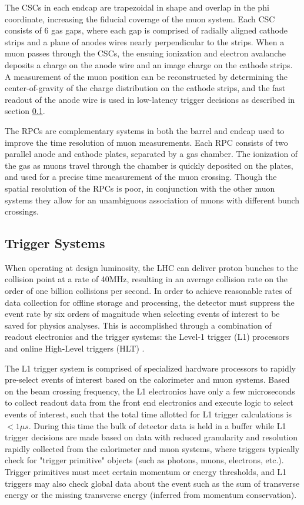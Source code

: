 The CSCs in each endcap are trapezoidal in shape and overlap in the phi coordinate, increasing the fiducial coverage of the muon system. Each CSC consists of 6 gas gaps, where each gap is comprised of radially aligned cathode strips and a plane of anodes wires nearly perpendicular to the strips. When a muon passes through the CSCs, the ensuing ionization and electron avalanche deposits a charge on the anode wire and an image charge on the cathode strips. A measurement of the muon position can be reconstructed by determining the center-of-gravity of the charge distribution on the cathode strips, and the fast readout of the anode wire is used in low-latency trigger decisions as described in section \ref{subsec:triggers}.

The RPCs are complementary systems in both the barrel and endcap used to improve the time resolution of muon measurements. Each RPC consists of two parallel anode and cathode plates, separated by a gas chamber. The ionization of the gas as muons travel through the chamber is quickly deposited on the plates, and used for a precise time measurement of the muon crossing. Though the spatial resolution of the RPCs is poor, in conjunction with the other muon systems they allow for an unambiguous association of muons with different bunch crossings.
 
\subsection{Trigger Systems}
\label{subsec:triggers}
When operating at design luminosity, the LHC can deliver proton bunches to the collision point at a rate of 40MHz, resulting in an average collision rate on the order of one billion collisions per second. In order to achieve reasonable rates of data collection for offline storage and processing, the detector must suppress the event rate by six orders of magnitude when selecting events of interest to be saved for physics analyses. This is accomplished through a combination of readout electronics and the trigger systems: the Level-1 trigger (L1) processors and online High-Level triggers (HLT) \cite{Lester:1999tx}.

The L1 trigger system is comprised of specialized hardware processors to rapidly pre-select events of interest based on the calorimeter and muon systems. Based on the beam crossing frequency, the L1 electronics have only a few microseconds to collect readout data from the front end electronics and execute logic to select events of interest, such that the total time allotted for L1 trigger calculations is $<1\mu s$. During this time the bulk of detector data is held in a buffer while L1 trigger decisions are made based on data with reduced granularity and resolution rapidly collected from the calorimeter and muon systems, where triggers typically check for "trigger primitive" objects (such as photons, muons, electrons, etc.). Trigger primitives must meet certain momentum or energy thresholds, and L1 triggers may also check global data about the event such as the sum of transverse energy or the missing transverse energy (inferred from momentum conservation). 

